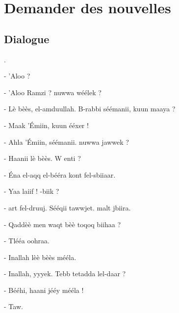 \chapter{Demander des nouvelles}

\section{Dialogue}
.\newline

- 'Aloo ? 

- 'Aloo Ramzi ? \VS nuwwa \hb wéélek ?

- Lè bèès, el-\hb amduullah. B-rabbi sééma\hb nii, \vs kuun m\ca aaya ? 

- M\ca aak 'Émiin, \vs kuun ééxer !

- Ahla 'Émiin, sééma\hb nii. \VS nuwwa jawwek ?

- Haanii lè bèès. W enti ? 

- Éna el-\hb aqq el-bééra\hb{} kont fel-sbii\ct aar. 

- Yaa la\ct iif ! \VS -biik ? 

- \CA\th art fel-druuj. Sééqii t\ca awwjet. \CA malt jbiira.

- Qaddèè\vs{} men waqt bèè\vs{} toq\ca oq biihaa ? 

- Tléé\th a o\vs ohraa.

- In\vs allah lèè bèès mééla. 

- In\vs allah, y\ca yy\vs ek. T\hb ebb tet\ca adda lel-daar ? 

- Bééhi, haani jééy mééla ! 

- T\vs aw. 